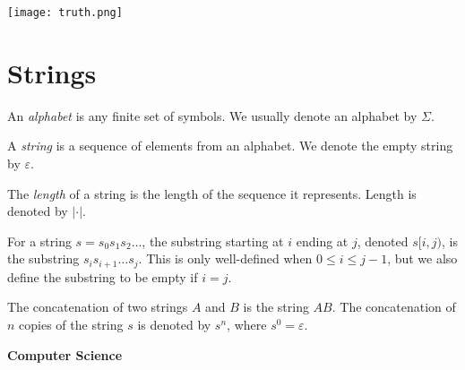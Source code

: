 \documentclass[10pt]{article}
\newcommand{\eps}{\varepsilon}
\newcommand{\header}[1]
{
\section*{#1}
}
\begin{document}
\begin{multicols}{3}
\begin{center}
\texttt{[image: truth.png]}
\end{center}

\header{Strings}

An \textit{alphabet} is any finite set of symbols.  We usually denote an alphabet by $\Sigma$.

A \textit{string} is a sequence of elements from an alphabet.  We denote the empty string by $\eps$.

The \textit{length} of a string is the length of the sequence it represents.  Length is denoted by $|\cdot|$.

For a string $s=s_0s_1s_2\ldots$, the substring starting at $i$ ending at $j$, denoted $s[i,j)$, is the substring $s_is_{i+1}\ldots s_j$.  This is only well-defined when $0\leq i\leq j-1$, but we also define the substring to be empty if $i=j$.

The concatenation of two strings $A$ and $B$ is the string $AB$.  The concatenation of $n$ copies of the string $s$ is denoted by $s^n$, where $s^0=\eps$.
\end{multicols}

\newpage

\restoregeometry
\setlength\parindent{1.5em}

\begin{center}
\huge\textbf{Computer Science}\normalsize

\vspace{3pt}
\end{center}
\end{document}
